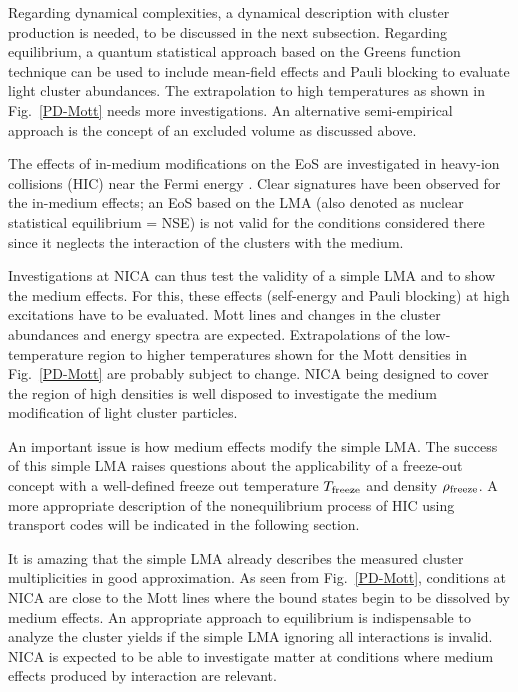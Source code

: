 \documentclass[epj]{svjour}
\begin{document}
Regarding dynamical complexities, a dynamical description with cluster production is needed, to be discussed in the next subsection.
Regarding equilibrium, a quantum statistical approach \cite{R15} based on the Greens function technique can be used to include mean-field effects and Pauli blocking to evaluate light cluster abundances. 
The extrapolation to high temperatures as shown in Fig.~\ref{PD-Mott} needs more investigations.
An alternative semi-empirical approach is the concept of an excluded volume as discussed above.

The effects of in-medium modifications on the EoS are investigated in heavy-ion collisions (HIC) near the Fermi energy \cite{Natowitz,NatowitzEoS}.
Clear signatures have been observed for the in-medium effects; 
an EoS based on the LMA (also denoted as nuclear statistical equilibrium = NSE) is not valid for the conditions considered there since it neglects the interaction of the clusters with the medium.

Investigations at NICA can thus test the validity of a simple LMA and to show the medium effects.
For this, these effects (self-energy and Pauli blocking) at high excitations have to be evaluated. 
Mott lines and changes in the cluster abundances and energy spectra are expected. 
Extrapolations of the low-temperature region to higher temperatures shown for the Mott densities in 
Fig.~\ref{PD-Mott} are probably subject to change. 
NICA being designed to cover the region of high densities is well disposed to investigate
the medium modification of light cluster particles.

An important issue is how medium effects modify the simple LMA.
The success of this simple LMA raises questions about the applicability of a freeze-out concept 
with a well-defined freeze out temperature $T_{\rm freeze}$
and density $\rho_{\rm freeze}$. 
A more appropriate description of the nonequilibrium process of HIC using transport codes 
will be indicated in the following section.

It is amazing that the simple LMA already describes the measured cluster multiplicities in good approximation. 
As seen from Fig.~\ref{PD-Mott}, conditions at NICA are close to the Mott lines where the bound states begin to be dissolved by medium effects. 
An appropriate approach to equilibrium is indispensable to analyze the cluster yields if the simple LMA ignoring all interactions is invalid. 
NICA is expected to be able to investigate matter at conditions where medium effects produced by interaction are relevant.
\end{document}
